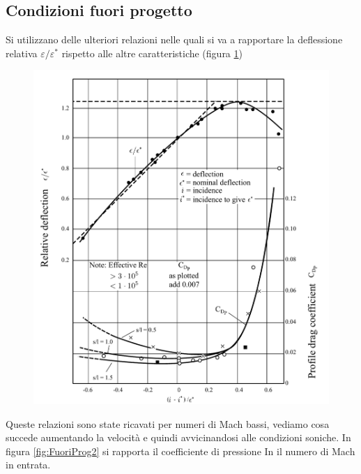 \subsection{Condizioni fuori progetto}
Si utilizzano delle ulteriori relazioni nelle quali si va a rapportare la deflessione relativa $\varepsilon/\varepsilon^*$ rispetto alle altre caratteristiche (figura \ref{fig:FuoriProg1})
\begin{figure}
\centering
  \includegraphics[width=\textwidth]{fig/FuoriProg1.pdf}
\caption{}
\label{fig:FuoriProg1}
\end{figure}
Queste relazioni sono state ricavati per numeri di Mach bassi, vediamo cosa succede aumentando la velocità e quindi avvicinandosi alle condizioni soniche. In figura \ref{fig:FuoriProg2} si rapporta il coefficiente di pressione In il numero di Mach in entrata. 

